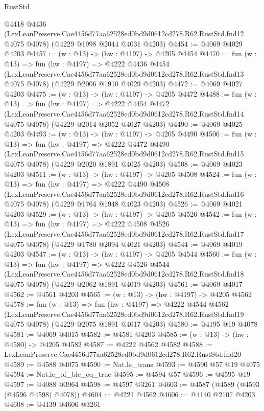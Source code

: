 \begin{lexlean}{RustStd}
\begin{coremodule}
    @4418
    @4436
    (LexLeanPreserve.Cae4456d77aa62528ed0bd9d0612cd278.R62.RustStd.fnd12 @4075 @4078)
    (@4229 @1998 @2044 @4031 @4203)
@4454 := @4069 @4029 @4203
@4457 := (w : @13) -> (hw : @4197) -> @4205 @4454
@4470 := fun (w : @13) =>
  fun (hw : @4197) =>
  @4222
    @4436
    @4454
    (LexLeanPreserve.Cae4456d77aa62528ed0bd9d0612cd278.R62.RustStd.fnd13 @4075 @4078)
    (@4229 @2006 @1910 @4029 @4203)
@4472 := @4069 @4027 @4203
@4475 := (w : @13) -> (hw : @4197) -> @4205 @4472
@4488 := fun (w : @13) =>
  fun (hw : @4197) =>
  @4222
    @4454
    @4472
    (LexLeanPreserve.Cae4456d77aa62528ed0bd9d0612cd278.R62.RustStd.fnd14 @4075 @4078)
    (@4229 @2014 @2052 @4027 @4203)
@4490 := @4069 @4025 @4203
@4493 := (w : @13) -> (hw : @4197) -> @4205 @4490
@4506 := fun (w : @13) =>
  fun (hw : @4197) =>
  @4222
    @4472
    @4490
    (LexLeanPreserve.Cae4456d77aa62528ed0bd9d0612cd278.R62.RustStd.fnd15 @4075 @4078)
    (@4229 @2020 @1891 @4025 @4203)
@4508 := @4069 @4023 @4203
@4511 := (w : @13) -> (hw : @4197) -> @4205 @4508
@4524 := fun (w : @13) =>
  fun (hw : @4197) =>
  @4222
    @4490
    @4508
    (LexLeanPreserve.Cae4456d77aa62528ed0bd9d0612cd278.R62.RustStd.fnd16 @4075 @4078)
    (@4229 @1764 @1948 @4023 @4203)
@4526 := @4069 @4021 @4203
@4529 := (w : @13) -> (hw : @4197) -> @4205 @4526
@4542 := fun (w : @13) =>
  fun (hw : @4197) =>
  @4222
    @4508
    @4526
    (LexLeanPreserve.Cae4456d77aa62528ed0bd9d0612cd278.R62.RustStd.fnd17 @4075 @4078)
    (@4229 @1780 @2094 @4021 @4203)
@4544 := @4069 @4019 @4203
@4547 := (w : @13) -> (hw : @4197) -> @4205 @4544
@4560 := fun (w : @13) =>
  fun (hw : @4197) =>
  @4222
    @4526
    @4544
    (LexLeanPreserve.Cae4456d77aa62528ed0bd9d0612cd278.R62.RustStd.fnd18 @4075 @4078)
    (@4229 @2062 @1891 @4019 @4203)
@4561 := @4069 @4017
@4562 := @4561 @4203
@4565 := (w : @13) -> (hw : @4197) -> @4205 @4562
@4578 := fun (w : @13) =>
  fun (hw : @4197) =>
  @4222
    @4544
    @4562
    (LexLeanPreserve.Cae4456d77aa62528ed0bd9d0612cd278.R62.RustStd.fnd19 @4075 @4078)
    (@4229 @2075 @1891 @4017 @4203)
@4580 := @4195 @19 @4078
@4581 := @4069 @4015
@4582 := @4581 @4203
@4585 := (w : @13) -> (hw : @4580) -> @4205 @4582
@4587 := @4222 @4562 @4582
@4588 := LexLeanPreserve.Cae4456d77aa62528ed0bd9d0612cd278.R62.RustStd.fnd20
@4589 := @4588 @4075
@4590 := Nat.le_trans
@4593 := @4590 @57 @19 @4075
@4594 := Nat.le_of_ble_eq_true
@4595 := @4594 @57
@4596 := @4595 @19
@4597 := @4088 @3964
@4598 := @4597 @3261
@4603 := @4587 (@4589 (@4593 (@4596 @4598) @4078))
@4604 := @4221 @4562
@4606 := @4140 @2107 @4203
@4608 := @4139 @4606 @3261

\end{coremodule}
\end{lexlean}
